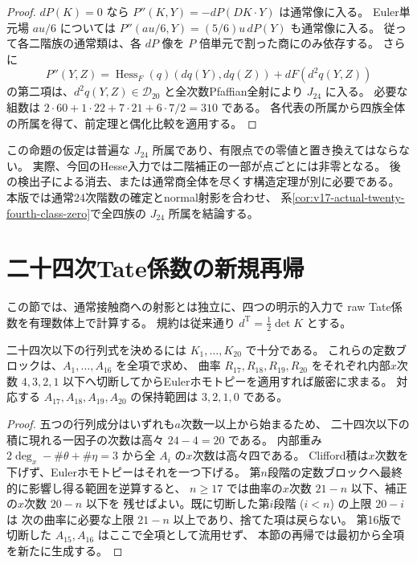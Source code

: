 \begin{proof}
$dP(K)=0$ なら
$P''(K,Y)=-dP(DK\cdot Y)$ は通常像に入る。
Euler単元場 $au/6$ については
$P''(au/6,Y)=(5/6)u\,dP(Y)$ も通常像に入る。
従って各二階族の通常類は、各 $dP$ 像を $P$ 倍単元で割った商にのみ依存する。
さらに
\[
 P''(Y,Z)=\operatorname{Hess}_F(q)(dq(Y),dq(Z))
                 +dF(d^2q(Y,Z))
\]
の第二項は、$d^2q(Y,Z)\in\mathcal D_{20}$ と全次数Pfaffian全射により $J_{24}$ に入る。
必要な組数は $2\cdot60+1\cdot22+7\cdot21+6\cdot7/2=310$ である。
各代表の所属から四族全体の所属を得て、前定理と偶化比較を適用する。
\end{proof}

この命題の仮定は普遍な $J_{24}$ 所属であり、有限点での零値と置き換えてはならない。
実際、今回のHesse入力では二階補正の一部が点ごとには非零となる。
後の検出子による消去、または通常商全体を尽くす構造定理が別に必要である。
本版では通常24次階数の確定とnormal射影を合わせ、
系\ref{cor:v17-actual-twenty-fourth-class-zero}で全四族の $J_{24}$ 所属を結論する。



\section{二十四次Tate係数の新規再帰}
\label{sec:v17-tate24}
この節では、通常接触商への射影とは独立に、四つの明示的入力で
raw Tate係数を有理数体上で計算する。
規約は従来通り $d^{\mathrm T}=\tfrac12\det K$ とする。

\begin{proposition}[二十四次に必要な再帰の範囲]\label{prop:v17-tate-truncation}
二十四次以下の行列式を決めるには $K_1,\ldots,K_{20}$ で十分である。
これらの定数ブロックは、$A_1,\ldots,A_{16}$ を全項で求め、
曲率 $R_{17},R_{18},R_{19},R_{20}$ をそれぞれ内部$x$次数
$4,3,2,1$ 以下へ切断してからEulerホモトピーを適用すれば厳密に求まる。
対応する $A_{17},A_{18},A_{19},A_{20}$ の保持範囲は $3,2,1,0$ である。
\end{proposition}
\begin{proof}
五つの行列成分はいずれも$a$次数一以上から始まるため、
二十四次以下の積に現れる一因子の次数は高々 $24-4=20$ である。
内部重み $2\deg_x-\#\theta+\#\eta=3$ から全 $A_i$ の$x$次数は高々四である。
Clifford積は$x$次数を下げず、Eulerホモトピーはそれを一つ下げる。
第$n$段階の定数ブロックへ最終的に影響し得る範囲を逆算すると、
$n\ge17$ では曲率の$x$次数 $21-n$ 以下、補正の$x$次数 $20-n$ 以下を
残せばよい。既に切断した第$i$段階 ($i<n$) の上限 $20-i$ は
次の曲率に必要な上限 $21-n$ 以上であり、捨てた項は戻らない。
第16版で切断した $A_{15},A_{16}$ はここで全項として流用せず、
本節の再帰では最初から全項を新たに生成する。
\end{proof}

